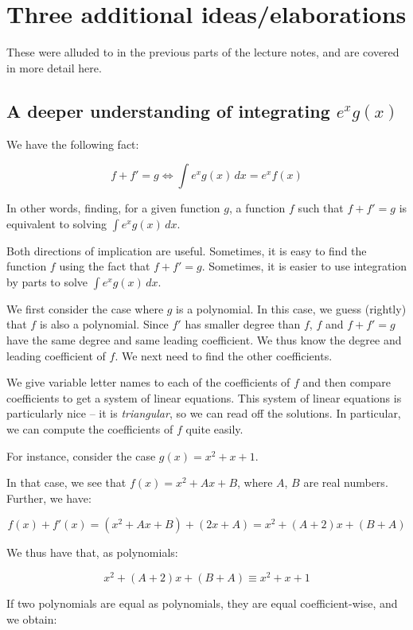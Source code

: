 \documentclass{amsart}
\begin{document}
\section{Three additional ideas/elaborations}

These were alluded to in the previous parts of the lecture notes, and
are covered in more detail here.

\subsection{A deeper understanding of integrating $e^xg(x)$}\label{sec:addlideaone}

We have the following fact:

$$f + f' = g \iff \int e^xg(x) \, dx = e^xf(x)$$

In other words, finding, for a given function $g$, a function $f$ such
that $f + f' = g$ is equivalent to solving $\int e^x g(x) \, dx$.

Both directions of implication are useful. Sometimes, it is easy to
find the function $f$ using the fact that $f + f' = g$. Sometimes, it
is easier to use integration by parts to solve $\int e^xg(x) \, dx$.

We first consider the case where $g$ is a polynomial. In this case, we
guess (rightly) that $f$ is also a polynomial. Since $f'$ has smaller
degree than $f$, $f$ and $f + f' = g$ have the same degree and same
leading coefficient. We thus know the degree and leading coefficient
of $f$. We next need to find the other coefficients.

We give variable letter names to each of the coefficients of $f$ and
then compare coefficients to get a system of linear equations. This
system of linear equations is particularly nice -- it is {\em
triangular}, so we can read off the solutions. In particular, we can
compute the coefficients of $f$ quite easily.

For instance, consider the case $g(x) = x^2 + x + 1$.

In that case, we see that $f(x) = x^2 + Ax + B$, where $A$, $B$ are
real numbers. Further, we have:

$$f(x) + f'(x) = (x^2 + Ax + B) + (2x + A) = x^2 + (A + 2)x + (B + A)$$

We thus have that, as polynomials:

$$x^2 + (A + 2)x + (B + A) \equiv x^2 + x + 1$$

If two polynomials are equal as polynomials, they are equal
coefficient-wise, and we obtain:
\end{document}
